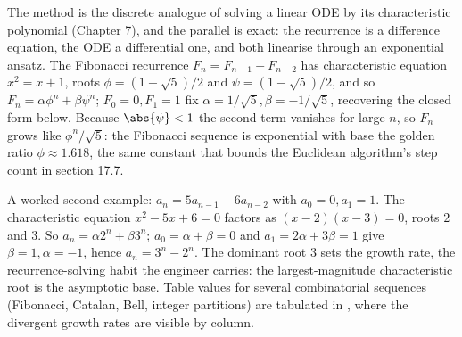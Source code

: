 The method is the discrete analogue of solving a linear ODE by its
characteristic polynomial (Chapter 7), and the parallel is exact:
the recurrence is a difference equation, the ODE a differential one,
and both linearise through an exponential ansatz. The Fibonacci
recurrence $F_{n} = F_{n-1} + F_{n-2}$ has characteristic equation
$x^{2} = x + 1$, roots $\phi = (1 + \sqrt{5})/2$ and $\psi = (1 -
\sqrt{5})/2$, and so $F_{n} = \alpha \phi^{n} + \beta \psi^{n}$;
$F_{0} = 0, F_{1} = 1$ fix $\alpha = 1/\sqrt{5}, \beta = -1/\sqrt{5}$,
recovering the closed form below. Because $\abs{\psi} < 1$ the
second term vanishes for large $n$, so $F_{n}$ grows like
$\phi^{n}/\sqrt{5}$: the Fibonacci sequence is exponential with base
the golden ratio $\phi \approx 1.618$, the same constant that bounds
the Euclidean algorithm's step count in section 17.7.

A worked second example: $a_{n} = 5 a_{n-1} - 6 a_{n-2}$ with $a_{0}
= 0, a_{1} = 1$. The characteristic equation $x^{2} - 5x + 6 = 0$
factors as $(x - 2)(x - 3) = 0$, roots $2$ and $3$. So $a_{n} =
\alpha 2^{n} + \beta 3^{n}$; $a_{0} = \alpha + \beta = 0$ and $a_{1}
= 2\alpha + 3\beta = 1$ give $\beta = 1, \alpha = -1$, hence $a_{n} =
3^{n} - 2^{n}$. The dominant root $3$ sets the growth rate, the
recurrence-solving habit the engineer carries: the largest-magnitude
characteristic root is the asymptotic base. Table values for several
combinatorial sequences (Fibonacci, Catalan, Bell, integer
partitions) are tabulated in
,
where the divergent growth rates are visible by column.

